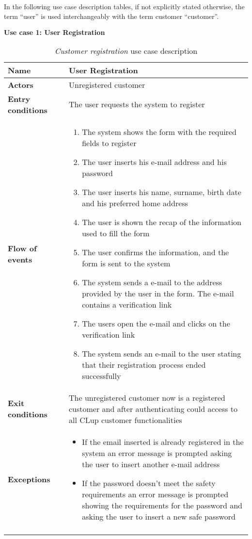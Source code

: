     \medskip
    \clearpage
    In the following use case description tables, if not explicitly stated otherwise, the term ``user'' is used interchangeably with the term customer ``customer''.  
    \medskip

\textbf{Use case 1: User Registration}
    \smallskip

    \begin{longtable}{p{0.25\linewidth}p{0.75\linewidth}}
    \toprule
    \textbf{Name} & \textbf{User Registration} \\
    \midrule
    \textbf{Actors} &  Unregistered customer \\
    \midrule
    \textbf{Entry conditions} & The user requests the system to register  \\
    \midrule
    \textbf{Flow of events} & 
    \begin{enumerate}
        \item The system shows the form with the required fields to register
        \item The user inserts his e-mail address and his password
        \item The user inserts his name, surname, birth date and his preferred home address
        \item The user is shown the recap of the information used to fill the form
        \item The user confirms the information, and the form is sent to the system
        \item The system sends a e-mail to the address provided by the user in the form. The e-mail contains a verification link
        \item The users open the e-mail and clicks on the verification link
        \item The system sends an e-mail to the user stating that their registration process ended successfully
    \end{enumerate}\\
    \midrule
    \textbf{Exit conditions} & The unregistered customer now is a registered customer and after authenticating could access to all CLup customer functionalities\\
    \midrule
    \textbf{Exceptions} & 
    \begin{itemize}
        \item If the email inserted is already registered in the system an error message is prompted asking the user to insert another e-mail address
        \item If the password doesn't meet the safety requirements an error message is prompted showing the requirements for the password and asking the user to insert a new safe password
    \end{itemize} \\
    \bottomrule
    \caption{\emph{Customer registration} use case description}
    \end{longtable}


